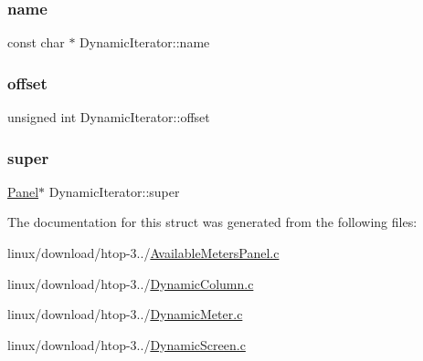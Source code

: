 \subsubsection{\texorpdfstring{name}{name}}
{\footnotesize\ttfamily const char $\ast$ Dynamic\+Iterator\+::name}

\mbox{\label{structDynamicIterator_a3227b817fbf56e5954a8d3693240eb6e}} 
\subsubsection{\texorpdfstring{offset}{offset}}
{\footnotesize\ttfamily unsigned int Dynamic\+Iterator\+::offset}

\mbox{\label{structDynamicIterator_a95461195c46ae98015e50fb6eef39479}} 
\subsubsection{\texorpdfstring{super}{super}}
{\footnotesize\ttfamily \hyperlink{Panel_8h_a034d4c16521db412dc7a1e8536d16fae}{Panel}$\ast$ Dynamic\+Iterator\+::super}



The documentation for this struct was generated from the following files\+:\begin{DoxyCompactItemize}
\item 
linux/download/htop-\/3../\hyperlink{AvailableMetersPanel_8c}{Available\+Meters\+Panel.\+c}\item 
linux/download/htop-\/3../\hyperlink{DynamicColumn_8c}{Dynamic\+Column.\+c}\item 
linux/download/htop-\/3../\hyperlink{DynamicMeter_8c}{Dynamic\+Meter.\+c}\item 
linux/download/htop-\/3../\hyperlink{DynamicScreen_8c}{Dynamic\+Screen.\+c}\end{DoxyCompactItemize}
